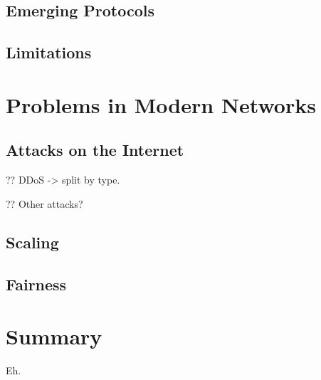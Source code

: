 \subsection{Emerging Protocols}

\subsection{Limitations}

\section{Problems in Modern Networks}\label{sec:problems-in-modern-networks}

\subsection{Attacks on the Internet}

?? DDoS -> split by type.

?? Other attacks?

\subsection{Scaling}

\subsection{Fairness}

\section{Summary}
Eh.
